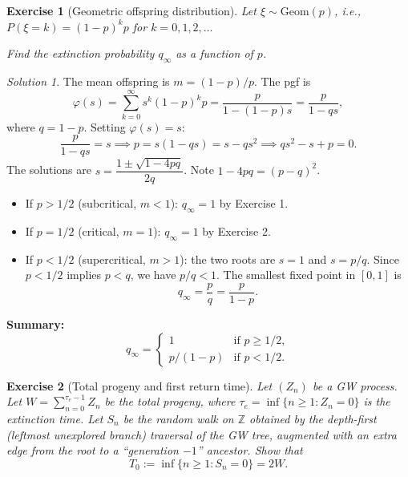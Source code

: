 \documentclass[12pt]{article}
\newtheorem{exercise}{Exercise}
\theoremstyle{remark}
\newtheorem*{solution}{Solution}
\begin{document}
\begin{exercise}[Geometric offspring distribution]
Let $\xi \sim \mathrm{Geom}(p)$, i.e., $P(\xi = k) = (1-p)^k p$ for $k = 0, 1, 2, \ldots$

Find the extinction probability $q_\infty$ as a function of $p$.
\end{exercise}

\begin{solution}
The mean offspring is $m = (1-p)/p$.  The pgf is
\[
  \varphi(s) = \sum_{k=0}^\infty s^k (1-p)^k p
  = \frac{p}{1 - (1-p)s} = \frac{p}{1 - qs},
\]
where $q = 1-p$.  Setting $\varphi(s) = s$:
\[
  \frac{p}{1-qs} = s \implies p = s(1-qs) = s - qs^2 \implies qs^2 - s + p = 0.
\]
The solutions are $s = \dfrac{1 \pm \sqrt{1 - 4pq}}{2q}$.  Note $1 - 4pq = (p-q)^2$.

\begin{itemize}
  \item If $p > 1/2$ (subcritical, $m < 1$): $q_\infty = 1$ by Exercise 1.
  \item If $p = 1/2$ (critical, $m = 1$): $q_\infty = 1$ by Exercise 2.
  \item If $p < 1/2$ (supercritical, $m > 1$): the two roots are
        $s = 1$ and $s = p/q$.  Since $p < 1/2$ implies $p < q$, we have $p/q < 1$.
        The smallest fixed point in $[0,1]$ is
        \[
          q_\infty = \frac{p}{q} = \frac{p}{1-p}.
        \]
\end{itemize}

\medskip\noindent\textbf{Summary:}
\[
  q_\infty = \begin{cases} 1 & \text{if } p \ge 1/2, \\[4pt] p/(1-p) & \text{if } p < 1/2. \end{cases}
\]
\end{solution}

\begin{exercise}[Total progeny and first return time]
\label{ex:tree-walk}
Let $(Z_n)$ be a GW process.  Let $W = \sum_{n=0}^{\tau_e - 1} Z_n$ be the total progeny,
where $\tau_e = \inf\{n \ge 1: Z_n = 0\}$ is the extinction time.  Let $S_n$ be the
random walk on $\mathbb{Z}$ obtained by the depth-first (leftmost unexplored branch)
traversal of the GW tree, augmented with an extra edge from the root to a ``generation
$-1$'' ancestor.  Show that
\[
  T_0 := \inf\{n \ge 1: S_n = 0\} = 2W.
\]
\end{exercise}
\end{document}
